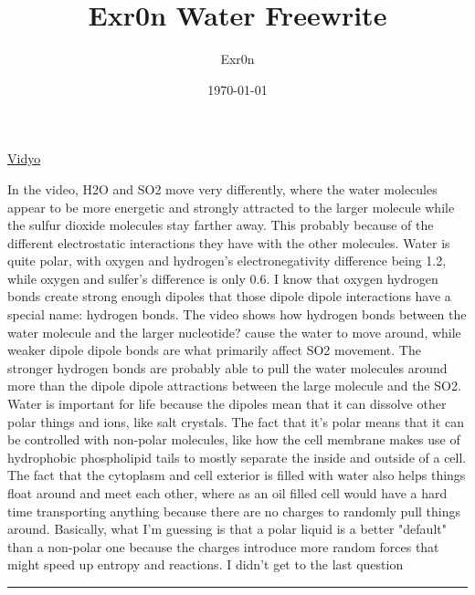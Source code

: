 \documentclass[letterpaper]{article}
\author{Exr0n}
\date{\today}
\title{Exr0n Water Freewrite}
\renewcommand{\tableofcontents}{}
\begin{document}
\tableofcontents

\href{https://docs.google.com/presentation/d/1tYwRk-rYtHwZPECztaiCxoiZd8ct2XSVFBEV3YTWC90/edit?usp=sharing}{Vidyo}

In the video, H2O and SO2 move very differently, where the water
molecules appear to be more energetic and strongly attracted to the
larger molecule while the sulfur dioxide molecules stay farther away.
This probably because of the different electrostatic interactions they
have with the other molecules. Water is quite polar, with oxygen and
hydrogen's electronegativity difference being 1.2, while oxygen and
sulfer's difference is only 0.6. I know that oxygen hydrogen bonds
create strong enough dipoles that those dipole dipole interactions have
a special name: hydrogen bonds. The video shows how hydrogen bonds
between the water molecule and the larger nucleotide? cause the water to
move around, while weaker dipole dipole bonds are what primarily affect
SO2 movement. The stronger hydrogen bonds are probably able to pull the
water molecules around more than the dipole dipole attractions between
the large molecule and the SO2. Water is important for life because the
dipoles mean that it can dissolve other polar things and ions, like salt
crystals. The fact that it's polar means that it can be controlled with
non-polar molecules, like how the cell membrane makes use of hydrophobic
phospholipid tails to mostly separate the inside and outside of a cell.
The fact that the cytoplasm and cell exterior is filled with water also
helps things float around and meet each other, where as an oil filled
cell would have a hard time transporting anything because there are no
charges to randomly pull things around. Basically, what I'm guessing is
that a polar liquid is a better "default" than a non-polar one because
the charges introduce more random forces that might speed up entropy and
reactions. I didn't get to the last question

\noindent\rule{\textwidth}{0.5pt}
\end{document}
